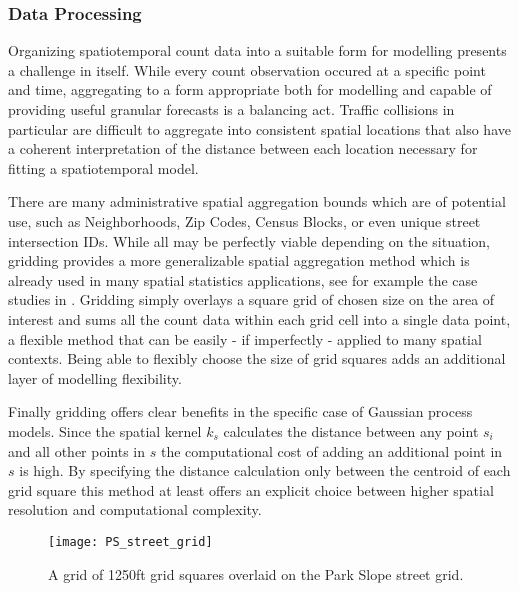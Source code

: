 \subsubsection{Data Processing}

Organizing spatiotemporal count data into a suitable form for modelling presents a challenge in itself. While every count observation occured at a specific point and time, aggregating to a form appropriate both for modelling and capable of providing useful granular forecasts is a balancing act. Traffic collisions in particular are difficult to aggregate into consistent spatial locations that also have a coherent interpretation of the distance between each location necessary for fitting a spatiotemporal model. \par

There are many administrative spatial aggregation bounds which are of potential use, such as Neighborhoods, Zip Codes, Census Blocks, or even unique street intersection IDs. While all may be perfectly viable depending on the situation, gridding provides a more generalizable spatial aggregation method which is already used in many spatial statistics applications, see for example the case studies in \cite{blangiardo_2015}. Gridding simply overlays a square grid of chosen size on the area of interest and sums all the count data within each grid cell into a single data point, a flexible method that can be easily - if imperfectly - applied to many spatial contexts. Being able to flexibly choose the size of grid squares adds an additional layer of modelling flexibility. \par

Finally gridding offers clear benefits in the specific case of Gaussian process models. Since the spatial kernel $k_s$ calculates the distance between any point $s_i$ and all other points in $s$ the computational cost of adding an additional point in $s$ is high. By specifying the distance calculation only between the centroid of each grid square this method at least offers an explicit choice between higher spatial resolution and computational complexity.


\begin{figure}[h!]
  \caption{A grid of 1250ft grid squares overlaid on the Park Slope street grid.}
  \texttt{[image: PS\_street\_grid]}
\end{figure}
